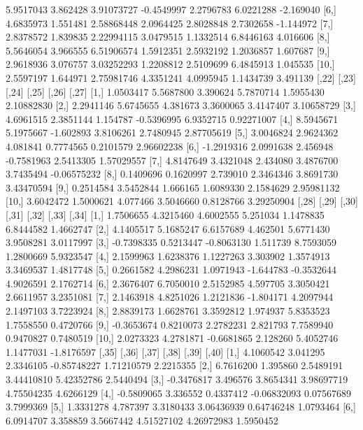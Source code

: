 \documentclass[12pt]{article}
\begin{document}
\begin{Schunk}
\begin{Soutput}
 [5,]  5.9517043 3.862428 3.91073727 -0.4549997 2.2796783 6.0221288 -2.169040
 [6,]  4.6835973 1.551481 2.58868448  2.0964425 2.8028848 2.7302658 -1.144972
 [7,]  2.8378572 1.839835 2.22994115  3.0479515 1.1332514 6.8446163  4.016606
 [8,]  5.5646054 3.966555 6.51906574  1.5912351 2.5932192 1.2036857  1.607687
 [9,]  2.9618936 3.076757 3.03252293  1.2208812 2.5109699 6.4845913  1.045535
[10,]  2.5597197 1.644971 2.75981746  4.3351241 4.0995945 1.1434739  3.491139
           [,22]     [,23]     [,24]      [,25]     [,26]       [,27]
 [1,]  1.0503417 5.5687800  3.390624  5.7870714 1.5955430  2.10882830
 [2,]  2.2941146 5.6745655  4.381673  3.3600065 3.4147407  3.10658729
 [3,]  4.6961515 2.3851144  1.154787 -0.5396995 6.9352715  0.92271007
 [4,]  8.5945671 5.1975667 -1.602893  3.8106261 2.7480945  2.87705619
 [5,]  3.0046824 2.9624362  4.081841  0.7774565 0.2101579  2.96602238
 [6,] -1.2919316 2.0991638  2.456948 -0.7581963 2.5413305  1.57029557
 [7,]  4.8147649 3.4321048  2.434080  3.4876700 3.7435494 -0.06575232
 [8,]  0.1409696 0.1620997  2.739010  2.3464346 3.8691730  3.43470594
 [9,]  0.2514584 3.5452844  1.666165  1.6089330 2.1584629  2.95981132
[10,]  3.6042472 1.5000621  4.077466  3.5046660 0.8128766  3.29250904
           [,28]     [,29]      [,30]     [,31]      [,32]     [,33]      [,34]
 [1,]  1.7506655 4.3215460  4.6002555  5.251034  1.1478835 6.8444582  1.4662747
 [2,]  4.1405517 5.1685247  6.6157689  4.462501  5.6771430 3.9508281  3.0117997
 [3,] -0.7398335 0.5213447 -0.8063130  1.511739  8.7593059 1.2800669  5.9323547
 [4,]  2.1599963 1.6238376  1.1227263  3.303902  1.3574913 3.3469537  1.4817748
 [5,]  0.2661582 4.2986231  1.0971943 -1.644783 -0.3532644 4.9026591  2.1762714
 [6,]  2.3676407 6.7050010  2.5152985  4.597705  3.3050421 2.6611957  3.2351081
 [7,]  2.1463918 4.8251026  1.2121836 -1.804171  4.2097944 2.1497103  3.7223924
 [8,]  2.8839173 1.6628761  3.3592812  1.974937  5.8353523 1.7558550  0.4720766
 [9,] -0.3653674 0.8210073  2.2782231  2.821793  7.7589940 0.9470827  0.7480519
[10,]  2.0273323 4.2781871 -0.6681865  2.128260  5.4052746 1.1477031 -1.8176597
           [,35]    [,36]     [,37]       [,38]       [,39]     [,40]
 [1,]  4.1060542 3.041295 2.3346105 -0.85748227  1.71210579 2.2215355
 [2,]  6.7616200 1.395860 2.5489191  3.44410810  5.42352786 2.5440494
 [3,] -0.3476817 3.496576 3.8654341  3.98697719  4.75504235 4.6266129
 [4,] -0.5809065 3.336552 0.4337412 -0.06832093  0.07567689 3.7999369
 [5,]  1.3331278 4.787397 3.3180433  3.06436939  0.64746248 1.0793464
 [6,]  6.0914707 3.358859 3.5667442  4.51527102  4.26972983 1.5950452

\end{Soutput}
\end{Schunk}
\end{document}
